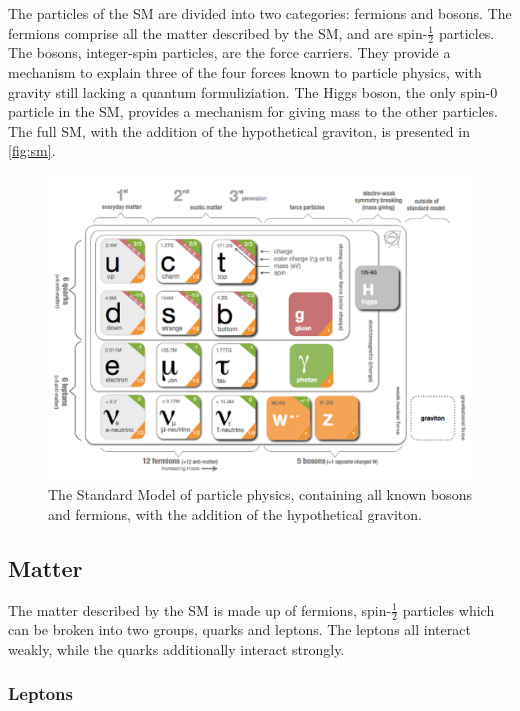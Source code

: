 The particles of the \ac{SM} are divided into two categories: fermions and bosons. The fermions comprise all the matter described by the \ac{SM}, and are spin-$\frac{1}{2}$ particles. The bosons, integer-spin particles, are the force carriers. They provide a mechanism to explain three of the four forces known to particle physics, with gravity still lacking a quantum formuliziation. The Higgs boson, the only spin-0 particle in the \ac{SM}, provides a mechanism for giving mass to the other particles. The full \ac{SM}, with the addition of the hypothetical graviton, is presented in \autoref{fig:sm}. 

\begin{centering}
\begin{figure}[bth]
\myfloatalign
\includegraphics[width=.85\linewidth]{figures/theory/standardmodel.png}
\caption{The Standard Model of particle physics, containing all known bosons and fermions, with the addition of the hypothetical graviton. \cite{Galbraith:2012}}
\label{fig:sm}
\end{figure}
\end{centering}

\subsection{Matter}
\label{sec:matter}

The matter described by the \ac{SM} is made up of fermions, spin-$\frac{1}{2}$ particles which can be broken into two groups, quarks and leptons. The leptons all interact weakly, while the quarks additionally interact strongly. 

\subsubsection{Leptons}


